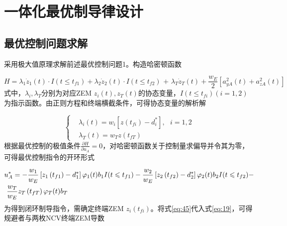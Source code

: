 \section{一体化最优制导律设计}
\subsection{最优控制问题求解}
采用极大值原理求解前述最优控制问题1。构造哈密顿函数

\begin{equation}
\label{eq:43}
H = {\lambda _1}{\dot z_1}(t) \cdot I(t \leqslant {t_{f1}}) + {\lambda _2}{\dot z_2}(t) \cdot I(t \leqslant {t_{f2}}){\text{ + }}{\lambda _T}{\dot z_T}(t) + \frac{{{w_E}}}{2}\left[ {a_{yA}^2(t) + a_{zA}^2(t)} \right]
\end{equation}
式中，${\lambda _i},{\lambda _T}$分别为对应ZEM ${z_i}(t),{z_T}(t)$的协态变量，$I(t \leqslant {t_{fi}})(i = 1,2)$为指示函数。由正则方程和终端横截条件，可得协态变量的解析解

\begin{equation}
\label{eq:44}
\left\{
\begin{aligned}
& {\lambda _i}\left( t \right) = {w_i}\left[ {z\left( {{t_{fi}}} \right) - d_i^*} \right],{\text{ }}i = 1,2 \\
& {\lambda _T}\left( t \right) = {w_T}z\left( {{t_{fT}}} \right)
\end{aligned}
\right.
\end{equation}
根据最优控制的极值条件$\frac{{\partial H}}{{\partial {u_A}}} = 0$，对哈密顿函数关于控制量求偏导并令其为零，可得最优控制指令的开环形式

\begin{equation}
\label{eq:45}
\begin{gathered}
  u_A^* =  - \frac{{{w_1}}}{{{w_E}}}\left[ {{z_1}\left( {{t_{f1}}} \right) - d_1^*} \right]{\varphi _1}(t){b_1}I(t \leqslant {t_{f1}}) - \frac{{{w_2}}}{{{w_E}}}\left[ {{z_2}\left( {{t_{f2}}} \right) - d_2^*} \right]{\varphi _2}(t){b_2}I(t \leqslant {t_{f2}}) -  \hfill \\
  {\text{    }}\frac{{{w_T}}}{{{w_E}}}{z_T}\left( {{t_{fT}}} \right){\varphi _T}(t){b_T} \hfill \\ 
\end{gathered}
\end{equation}
为得到闭环制导指令，需确定终端ZEM ${z_i}({t_{fi}})$。将式\eqref{eq:45}代入式\eqref{eq:19}，可得规避者与两枚NCV终端ZEM导数

